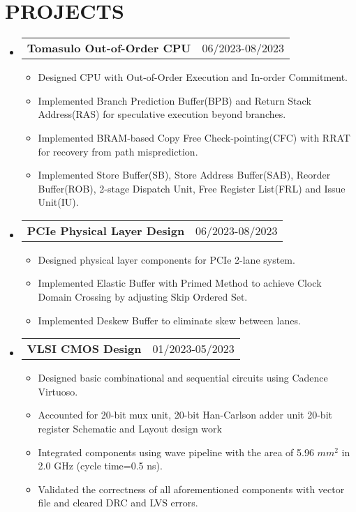 \documentclass[letterpaper,11pt]{article}
\makeatletter
\newcommand{\resumeItemOne}[1]{
  \item\small{#1}
}
\newcommand{\resumeSubheadingNoTitle}[2]{
  \vspace{-1pt}\item
    \begin{tabular*}{0.97\textwidth}[t]{l@{\extracolsep{\fill}}r}
      \textbf{#1} & #2 %
    \end{tabular*}\vspace{-5pt}
}
\newcommand{\resumeSubHeadingListStart}{\begin{itemize}[leftmargin=*]}
\newcommand{\resumeSubHeadingListEnd}{\end{itemize}\vspace{-5pt}}
\newcommand{\resumeItemListStart}{\begin{itemize}}
\newcommand{\resumeItemListEnd}{\end{itemize}\vspace{-10pt}}
\makeatother
\begin{document}
\section{PROJECTS}
\resumeSubHeadingListStart
\resumeSubheadingNoTitle
    {Tomasulo Out-of-Order CPU}{06/2023-08/2023}
\resumeItemListStart
	\resumeItemOne{Designed CPU with Out-of-Order Execution and In-order Commitment.}
	\resumeItemOne{Implemented Branch Prediction Buffer(BPB) and Return Stack Address(RAS) for speculative execution beyond branches.}
	\resumeItemOne{Implemented BRAM-based Copy Free Check-pointing(CFC) with RRAT for recovery from path misprediction.}
	\resumeItemOne{Implemented Store Buffer(SB), Store Address Buffer(SAB), Reorder Buffer(ROB), 2-stage Dispatch Unit, Free Register List(FRL) and Issue Unit(IU).}
\resumeItemListEnd
\resumeSubheadingNoTitle
    {PCIe Physical Layer Design}{06/2023-08/2023}
\resumeItemListStart
	\resumeItemOne{Designed physical layer components for PCIe 2-lane system.}
	\resumeItemOne{Implemented Elastic Buffer with Primed Method to achieve Clock Domain Crossing by adjusting Skip Ordered Set.}
	\resumeItemOne{Implemented Deskew Buffer to eliminate skew between lanes.}
\resumeItemListEnd
\resumeSubheadingNoTitle
    {VLSI CMOS Design}{01/2023-05/2023}
\resumeItemListStart
	\resumeItemOne{Designed basic combinational and sequential circuits using Cadence Virtuoso.}
	\resumeItemOne{Accounted for 20-bit mux unit, 20-bit Han-Carlson adder unit 20-bit register Schematic and Layout design work}
	\resumeItemOne{Integrated components using wave pipeline with the area of 5.96 $mm^2$ in 2.0 GHz (cycle time=0.5 ns).}
	\resumeItemOne{Validated the correctness of all aforementioned components with vector file and cleared DRC and LVS errors.}
\resumeItemListEnd
\resumeSubHeadingListEnd
\end{document}
